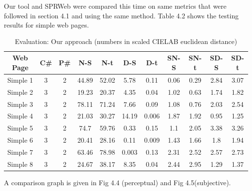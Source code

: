 Our tool and SPRWeb were compared this time on same metrics that were followed in section 4.1 and using the same method. Table 4.2 shows the testing results for simple web pages. 


\begin{table}[!htb]
\caption{Evaluation: Our approach (numbers in scaled CIELAB euclidean distance)}
\centering
\begin{tabular}{c c c c c c c c c c c}
\hline\hline
Web Page & C\# & P\# & N-S & N-t & D-S & D-t & SN-S & SN-t & SD-S & SD-t\\ [0.5ex]
\hline
Simple 1&3&2&44.89&52.02&5.78&0.11&0.06&0.29&2.84&3.07\\
Simple 2&3&2&19.23&20.37&4.35&0.04&1.02&0.63&1.74&1.82\\
Simple 3&3&2&78.11&71.24&7.66&0.09&1.08&0.76&2.03&2.54\\
Simple 4&3&2&21.03&30.27&14.19&0.006&1.87&1.92&0.95&1.25\\
Simple 5&3&2&74.7&59.76&0.33&0.15&1.1&2.05&3.38&3.26\\
Simple 6&3&2&20.41&28.16&0.11&0.009&1.43&1.66&1.8&1.94\\
Simple 7&3&2&63.46&78.98&0.003&0.13&2.31&2.52&2.57&2.73\\
Simple 8&3&2&24.67&38.17&8.35&0.04&2.44&2.95&1.29&1.37\\[1ex]
\hline
\end{tabular}
\label{table:nonlin}
\end{table}

A comparison graph is given in Fig 4.4 (perceptual) and Fig 4.5(subjective).

